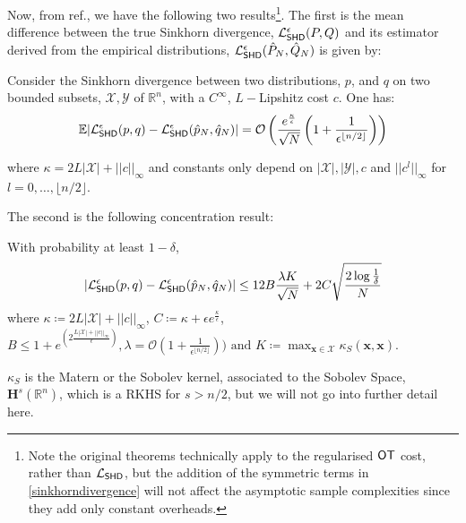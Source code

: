 
Now, from ref., we have the following two results\footnote{Note the original theorems technically apply to the regularised $\operatorname{\textsf{OT}}$ cost, rather than $\mathcal{L}_{\operatorname{\textsf{SHD}}}$, but the addition of the symmetric terms in \eqref{sinkhorndivergence} will not affect the asymptotic sample complexities since they add only constant overheads.}. The first is the mean difference between the true Sinkhorn divergence, $\mathcal{L}_{\operatorname{\textsf{SHD}}}^\epsilon(P, Q)$ and its estimator derived from the empirical distributions, $\mathcal{L}_{\operatorname{\textsf{SHD}}}^\epsilon(\hat{P}_N, \hat{Q}_N)$ is given by:
\begin{theorem}\label{thm:sinkhornexpectationsamplecomplexity_supp}
Consider the Sinkhorn divergence between two distributions, $p$, and $q$ on two bounded subsets, $\mathcal{X}, \mathcal{Y}$ of $\mathbb{R}^n$, with a $C^{\infty}$, $L-$Lipshitz cost $c$. One has:
\begin{align}
    \mathbb{E}|\mathcal{L}_{\operatorname{\textsf{SHD}}}^\epsilon(p,q) - \mathcal{L}_{\operatorname{\textsf{SHD}}}^\epsilon(\hat{p}_N, \hat{q}_N)| = \mathcal{O}\left(\frac{e^{\frac{\kappa}{\epsilon}}}{\sqrt{N}}\left(1+\frac{1}{\epsilon^{\lfloor n/2\rfloor}}\right)\right)
\end{align}


where $\kappa = 2L|\mathcal{X}|+||c||_{\infty}$ and constants only depend on $|\mathcal{X}|, |\mathcal{Y}|, c$ and $||c^{l}||_{\infty}$ for $l = 0, \dots, \lfloor n/2\rfloor$.
\end{theorem}
The second is the following concentration result:

\begin{corollary}
\label{thm:sinkhornconcentrationsamplecomplexity_supp}
With probability at least $1-\delta$,
\begin{align}
    |\mathcal{L}_{\operatorname{\textsf{SHD}}}^\epsilon(p,q) - \mathcal{L}_{\operatorname{\textsf{SHD}}}^\epsilon(\hat{p}_N, \hat{q}_N)| \leq 12B\frac{\lambda K}{\sqrt{N}} + 2C\sqrt{\frac{2\log\frac{1}{\delta}}{N}}\label{sinkhornconcentrationsamplecomplexity_supp}
\end{align}
where $\kappa  \coloneqq 2L|\mathcal{X}|+||c||_{\infty}$, $C  \coloneqq \kappa + \epsilon e^{\frac{\kappa}{\epsilon}}$, $B\leq 1+e^{\left(2\frac{L|\mathcal{X}|+||c||_{\infty}}{\epsilon}\right)}, \lambda = \mathcal{O}(1+ \frac{1}{\epsilon^{\lfloor n/2\rfloor}})) \text{ and } K  \coloneqq \max_{\mathbf{x} \in \mathcal{X}}\kappa_S(\mathbf{x}, \mathbf{x})$.
\end{corollary}
$\kappa_S$ is the Matern or the Sobolev kernel, associated to the Sobolev Space, $\mathbf{H}^s(\mathbb{R}^n)$, which is a RKHS for $s > n/2$, but we will not go into further detail here.

